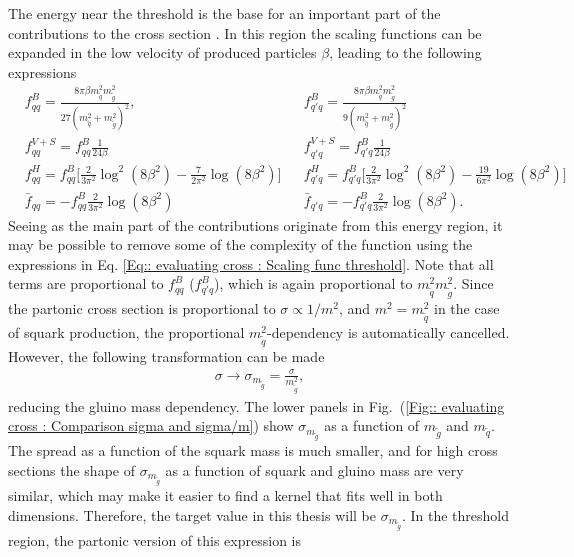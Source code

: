\documentclass[twoside,english]{uiofysmaster}
\begin{document}
The energy near the threshold is the base for an important part of the contributions to the cross section \cite{beenakker1997squark}. In this region the scaling functions can be expanded in the low velocity of produced particles $\beta$, leading to the following expressions \cite{beenakker1997squark}
\begin{align}
&f_{qq}^B = \frac{8 \pi \beta m_{\tilde{q}}^2 m_{\tilde{g}}^2}{27(m_{\tilde{q}}^2 + m_{\tilde{g}}^2)^2}, &&f_{q'q}^B = \frac{8 \pi \beta m_{\tilde{q}}^2 m_{\tilde{g}}^2}{9(m_{\tilde{q}}^2 + m_{\tilde{g}}^2)^2} \nonumber \\
& f_{qq}^{V+S} = f_{qq}^B \frac{1}{24 \beta} && f_{q'q}^{V+S} = f_{q'q}^B \frac{1}{24 \beta} \nonumber \\
&f_{qq}^H = f_{qq}^B \Big[\frac{2}{3 \pi^2} \log^2(8 \beta^2) - \frac{7}{2 \pi^2} \log (8 \beta^2) \Big] &&f_{q'q}^H = f_{q'q}^B \Big[\frac{2}{3 \pi^2} \log^2(8 \beta^2) - \frac{19}{6 \pi^2} \log (8 \beta^2) \Big] \nonumber \\
& \bar{f}_{qq} = - f_{qq}^B \frac{2}{3 \pi^2} \log (8 \beta^2) &&\bar{f}_{q'q} = - f_{q'q}^B \frac{2}{3 \pi^2} \log (8 \beta^2).\label{Eq:: evaluating cross : Scaling func threshold}
\end{align}
Seeing as the main part of the contributions originate from this energy region, it may be possible to remove some of the complexity of the function using the expressions in Eq. \ref{Eq:: evaluating cross : Scaling func threshold}. Note that all terms are proportional to $f_{qq}^B$ ($f_{q'q}^B$), which is again proportional to $m_{\tilde{q}}^2 m_{\tilde{g}}^2$. Since the partonic cross section is proportional to $\sigma \propto 1/m^2$, and $m^2 = m_{\tilde{q}}^2$ in the case of squark production, the proportional $m_{\tilde{q}}^2$-dependency is automatically cancelled. However, the following transformation can be made
\begin{align}
\sigma \rightarrow \sigma_{m_{\tilde{g}}} = \frac{\sigma}{m_{\tilde{g}}^2},
\end{align}
reducing the gluino mass dependency. The lower panels in Fig.\ (\ref{Fig:: evaluating cross : Comparison sigma and sigma/m}) show $\sigma_{m_{\tilde{g}}}$ as a function of $m_{\tilde{g}}$ and $m_{\tilde{q}}$. The spread as a function of the squark mass is much smaller, and for high cross sections the shape of $\sigma_{m_{\tilde{g}}}$ as a function of squark and gluino mass are very similar, which may make it easier to find a kernel that fits well in both dimensions. Therefore, the target value in this thesis will be $\sigma_{m_{\tilde{g}}}$. In the threshold region, the partonic version of this expression is
\end{document}
